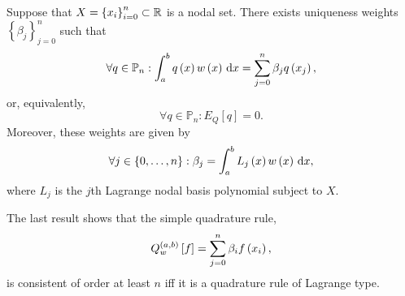 \begin{frame}
	\begin{theorem}
		Suppose that $X={\left\{x_{i}\right\}}_{i=0}^{n}\subset\mathbb{R}$ is a nodal set.
		There exists uniqueness weights $\left\{\beta_{j}\right\}_{j=0}^{n}$
		such that
		\begin{equation*}
			\forall q\in\mathbb{P}_{n}:
			\int_{a}^{b}
			q\left(x\right)
			w\left(x\right)
			\dl x=
			\sum_{j=0}^{n}
			\beta_{j}
			q\left(x_{j}\right),
		\end{equation*}
		or, equivalently,
		\begin{equation*}
			\forall q\in\mathbb{P}_{n}:
			E_{Q}\left[q\right]=0.
		\end{equation*}
		Moreover, these weights are given by
		\begin{equation*}
			\forall j\in\left\{0,\dotsc,n\right\}:
			\beta_{j}=
			\int_{a}^{b}
			L_{j}\left(x\right)
			w\left(x\right)
			\dl x,
		\end{equation*}
		where $L_{j}$ is the $j$th Lagrange nodal basis polynomial subject to $X$.
	\end{theorem}

	\begin{theorem}[consistency]
		The last result shows that the simple quadrature rule,
		\begin{equation*}
			Q^{\left(a,b\right)}_{w}
			\left[f\right]=
			\sum_{j=0}^{n}
			\beta_{i}
			f\left(x_{i}\right),
		\end{equation*}
		is consistent of order at least $n$ iff it is a quadrature
		rule of Lagrange type.
	\end{theorem}
\end{frame}

